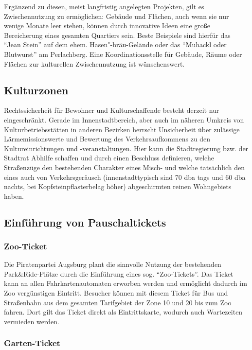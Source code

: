   Ergänzend zu diesen, meist langfristig angelegten Projekten, gilt es 
  Zwischennutzung zu ermöglichen: Gebäude und Flächen, auch wenn sie nur 
  wenige Monate leer stehen, können durch innovative Ideen eine große 
  Bereicherung eines gesamten Quartiers sein. Beste Beispiele sind hierfür 
  das "`Jean Stein"' auf dem ehem. Hasen"-bräu-Gelände oder das "`Muhackl oder 
  Blutwurst"' am Perlachberg. Eine Koordinationsstelle für Gebäude, Räume oder 
  Flächen zur kulturellen Zwischennutzung ist wünschenswert.
  
  \subsection{Kulturzonen}
  
  Rechtssicherheit für Bewohner und Kulturschaffende besteht derzeit nur 
  eingeschränkt. Gerade im Innenstadtbereich, aber auch im näheren Umkreis 
  von Kulturbetriebsstätten in anderen Bezirken herrscht Unsicherheit über 
  zulässige Lärmemissionswerte und Bewertung des Verkehrsaufkommens zu den 
  Kultureinrichtungen und -veranstaltungen. Hier kann die Stadtregierung bzw. 
  der Stadtrat Abhilfe schaffen und durch einen Beschluss definieren, welche 
  Straßenzüge den bestehenden Charakter eines Misch- und welche tatsächlich 
  den eines auch von Verkehrsgeräusch (innenstadttypisch sind 70 dba tags und 
  60 dba nachts, bei Kopfsteinpflasterbelag höher) abgeschirmten reinen 
  Wohngebiets haben.
  
  \subsection{Einführung von Pauschaltickets}
  
  \subsubsection{Zoo-Ticket}
  
  Die Piratenpartei Augsburg plant die sinnvolle Nutzung der bestehenden 
  Park\&Ride-Plätze durch die Einführung eines sog. "`Zoo-Tickets"'. Das 
  Ticket 
  kann an allen Fahrkartenautomaten erworben werden und ermöglicht dadurch im 
  Zoo vergünstigen Eintritt. Besucher können mit diesem Ticket für Bus und 
  Straßenbahn aus dem gesamten Tarifgebiet der Zone 10 und 20 bis zum Zoo 
  fahren. Dort gilt das Ticket direkt als Eintrittskarte, wodurch auch 
  Wartezeiten vermieden werden.
  
  \subsubsection{Garten-Ticket}
  

